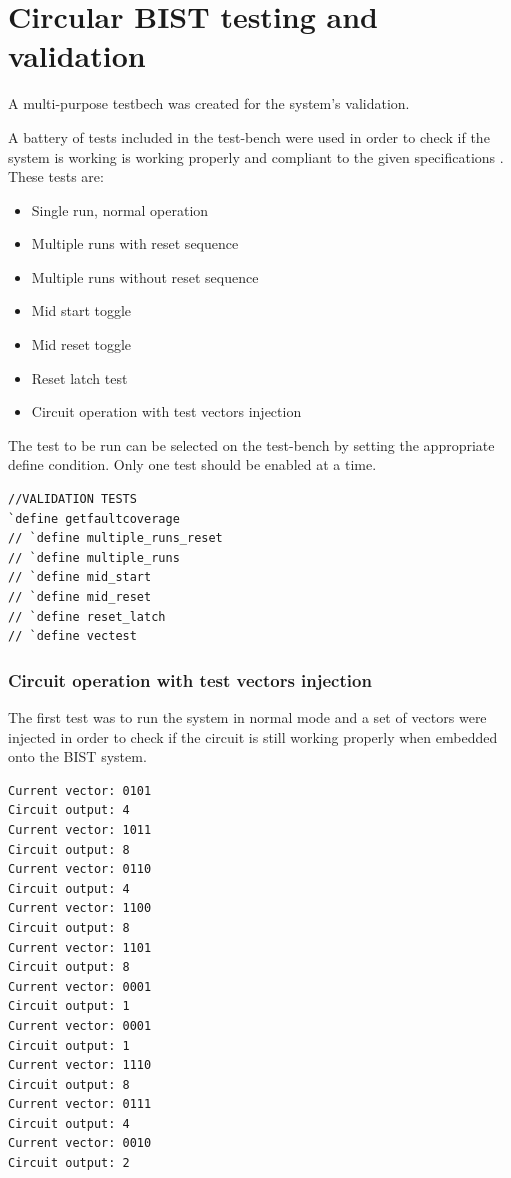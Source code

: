 \documentclass[12pt]{article}
\begin{document}
\section{Circular BIST testing and validation}

A multi-purpose testbech was created for the system's validation. 

A battery of tests included in the test-bench were used in order to check if the system is working is working properly and compliant to the given specifications . These tests are:

\begin{itemize}
  \item Single run, normal operation
  \item Multiple runs with reset sequence
  \item Multiple runs without reset sequence
  \item Mid start toggle
  \item Mid reset toggle
  \item Reset latch test
  \item Circuit operation with test vectors injection
\end{itemize}



The test to be run can be selected on the test-bench by setting the appropriate define condition. Only one test should be enabled at a time.

    \begin{lstlisting}[caption={Configurable test-bench parameters.},captionpos=b]
//VALIDATION TESTS
`define getfaultcoverage
// `define multiple_runs_reset
// `define multiple_runs
// `define mid_start
// `define mid_reset
// `define reset_latch
// `define vectest
    \end{lstlisting}  

    \subsubsection*{Circuit operation with test vectors injection}

The first test was to run the system in normal mode and a set of vectors were injected in order to check if the circuit is still working properly when embedded onto the BIST system.
\newpage

    \begin{lstlisting}[caption={Normal operation output.},captionpos=b]
Current vector: 0101
Circuit output: 4
Current vector: 1011
Circuit output: 8
Current vector: 0110
Circuit output: 4
Current vector: 1100
Circuit output: 8
Current vector: 1101
Circuit output: 8
Current vector: 0001
Circuit output: 1
Current vector: 0001
Circuit output: 1
Current vector: 1110
Circuit output: 8
Current vector: 0111
Circuit output: 4
Current vector: 0010
Circuit output: 2
    \end{lstlisting}  
    
\end{document}

